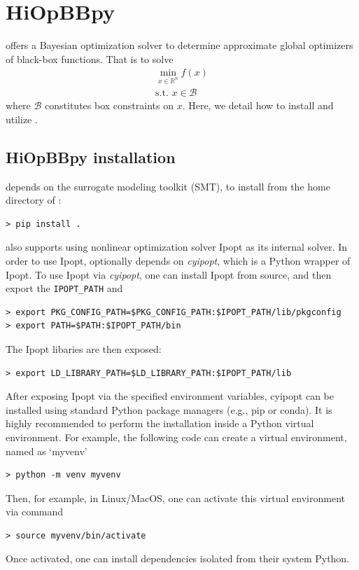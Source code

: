 
\section{HiOpBBpy}

\Hi offers a Bayesian optimization \Hibbpy solver to determine approximate global optimizers of black-box functions. That is to solve
\begin{align*}
\min_{x\in\mathbb{R}^n}f(x)\\
\text{s.t. } x\in \mathcal{B}
\end{align*}
where $\mathcal{B}$ constitutes box constraints on $x$. Here, we detail how to install and utilize \Hibbpy.

\subsection{HiOpBBpy installation}

\Hibbpy depends on the surrogate modeling toolkit (SMT), to install \Hibbpy from the home directory of \Hi:
\begin{verbatim}
> pip install .
\end{verbatim}

\Hibbpy also supports using nonlinear optimization solver Ipopt \cite{ipopt_impl} as its internal solver. 
In order to use Ipopt, \Hibbpy optionally depends on {\it{cyipopt}}, which is a Python wrapper of Ipopt.
To use Ipopt via {\it{cyipopt}}, one can install Ipopt from source, and then export the \verb~IPOPT_PATH~ and 
\begin{verbatim}
> export PKG_CONFIG_PATH=$PKG_CONFIG_PATH:$IPOPT_PATH/lib/pkgconfig
> export PATH=$PATH:$IPOPT_PATH/bin
\end{verbatim}

The Ipopt libaries are then exposed:
\begin{verbatim}
> export LD_LIBRARY_PATH=$LD_LIBRARY_PATH:$IPOPT_PATH/lib
\end{verbatim}

After exposing Ipopt via the specified environment variables, cyipopt can be installed using standard Python package 
managers (e.g., pip or conda). It is highly recommended to perform the installation inside a Python virtual environment. 
For example, the following code can create a virtual environment, named as `myvenv'
\begin{verbatim}
> python -m venv myvenv 
\end{verbatim}
Then, for example, in Linux/MacOS, one can activate this virtual environment via command
\begin{verbatim}
> source myvenv/bin/activate
\end{verbatim}
Once activated, one can install dependencies isolated from their system Python.


